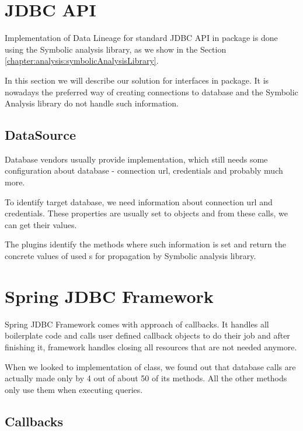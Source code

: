 \section{JDBC API \label{implementation:jdbc}}

Implementation of Data Lineage for standard JDBC API in  package
is done using the Symbolic analysis library, as we show in the Section \ref{chapter:analysis:symbolicAnalysisLibrary}.

In this section we will describe our solution for  interfaces in  package.
It is nowadays the preferred way of creating connections to database and the Symbolic Analysis
library do not handle such information.



\subsection{DataSource \label{implementation:dataSource}}

Database vendors usually provide  implementation, which still
needs some configuration about database - connection url, credentials and probably much more.

To identify target database, we need information about connection url and credentials. These properties
are usually set to  objects and from these calls, we can get
their values.

The plugins identify the methods where such information is set and return
the concrete values of used s for propagation by Symbolic analysis library.



\section{Spring JDBC Framework}

Spring JDBC Framework comes with approach of callbacks. It handles
all boilerplate code and calls user defined callback objects to do their job
and after finishing it, framework handles closing all resources that are not needed anymore.

When we looked to implementation of  class, we found out
that database calls are actually made only by 4 out of about 50 of its methods.
All the other methods only use them when executing queries.



\subsection{Callbacks}

